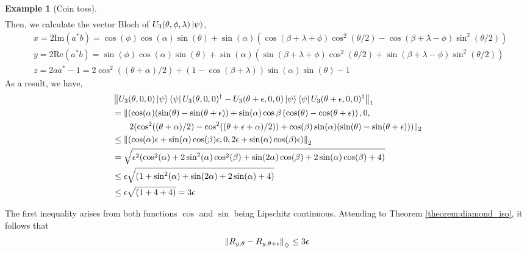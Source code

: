 \documentclass[10pt,a4paper]{amsart}
\theoremstyle{definition}
\theoremstyle{definition}
\newtheorem{example}[definition]{Example}
\theoremstyle{definition}
\theoremstyle{definition}
\theoremstyle{definition}
\theoremstyle{definition}
\begin{document}
\begin{example}[Coin toss]
\begin{align*}
\end{align*}
Then, we calculate the vector Bloch of $U_3(\theta, \phi, \lambda) \ket{\psi}$,
\begin{align*}
  &x = 2 \text{Im} \left( a^{*}b \right) =   \cos(\phi) \cos(\alpha) \sin(\theta) +  \sin(\alpha) \left(\cos{(\beta + \lambda + \phi)} \cos^2(\theta/2) - \cos{(\beta + \lambda - \phi)} \sin^2(\theta/2)\right)  \\
  &y = 2 \text{Re} \left( a^{*}b \right) = \sin(\phi) \cos(\alpha) \sin(\theta) +  \sin(\alpha) \left(\sin{(\beta + \lambda + \phi)} \cos^2(\theta/2) + \sin{(\beta + \lambda - \phi)} \sin^2(\theta/2)\right) \\
  & z = 2 aa^* -1 = 2 \cos^2((\theta+\alpha)/2)+(1-\cos(\beta + \lambda))\sin(\alpha)\sin(\theta) -1
\end{align*}
As a result, we have,
\begin{align*}
  & \left\lVert U_3(\theta, 0, 0) \ket{\psi}\bra{\psi} U_3(\theta, 0, 0)^\dag - U_3(\theta + \epsilon, 0, 0) \ket{\psi}\bra{\psi}U_3(\theta+\epsilon, 0, 0)^\dag  \right\rVert_{1} \\
  & = \lVert ( \cos(\alpha) (\sin(\theta) - \sin(\theta + \epsilon)) +  \sin(\alpha) \cos{\beta} \left(\cos(\theta) - \cos(\theta + \epsilon) \right) , 0,\\
  & \hspace{20pt} 2 (\cos^2((\theta+\alpha)/2) - \cos^2((\theta+ \epsilon+\alpha)/2))+\cos(\beta) \sin(\alpha)(\sin(\theta) - \sin(\theta+\epsilon)) )\rVert_2 \\
  &  \leq \left\lVert ( \cos(\alpha)\epsilon + \sin(\alpha)\cos(\beta) \epsilon, 0, 2\epsilon + \sin(\alpha)\cos(\beta) \epsilon) \right\rVert_{2} \\
  & = \sqrt{\epsilon^2(\cos^2(\alpha) + 2\sin^2(\alpha)\cos^2(\beta)+\sin(2\alpha)\cos(\beta) + 2\sin(\alpha)\cos(\beta) + 4 )} \\
  &\leq \epsilon \sqrt{(1 + \sin^2(\alpha) +\sin(2\alpha) + 2\sin(\alpha) + 4 )} \\
  & \leq \epsilon \sqrt{(1 + 4 + 4 )} = 3 \epsilon
\end{align*}

The first inequality arises from both functions $\cos$ and $\sin$ being Lipschitz continuous. Attending to Theorem \ref{theorem:diamond_iso}, it follows that
  \begin{align*}
    \left\lVert R_{y, \theta}- R_{y, \theta + \epsilon}  \right\rVert_{\diamondsuit} \leq 3 \epsilon
  \end{align*}


\end{example}
\end{document}
